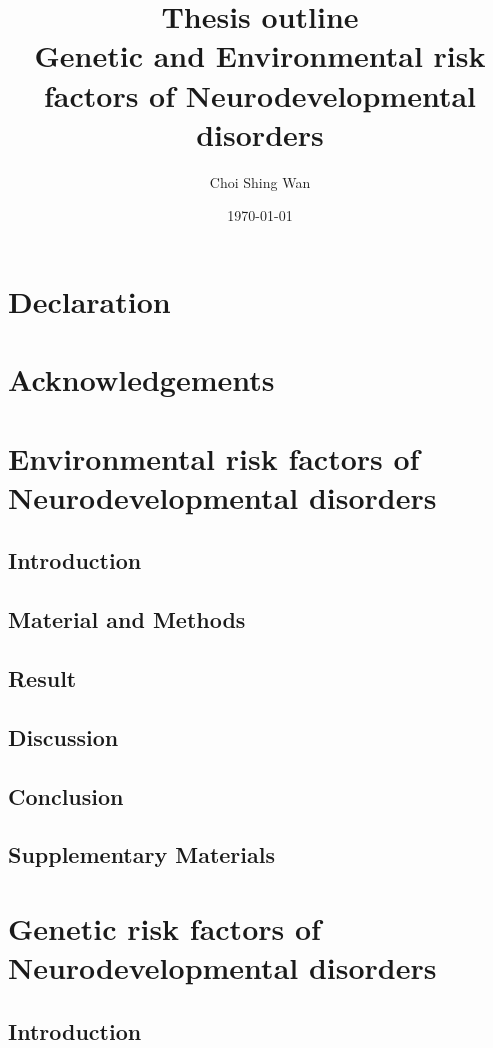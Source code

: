 \documentclass{report}
\title{Thesis outline \\
\large Genetic and Environmental risk factors of Neurodevelopmental disorders}
\date{\today}
\author{Choi Shing Wan}
\begin{document}
\maketitle
\chapter*{Declaration}
\chapter*{Acknowledgements}
\tableofcontents

 \onehalfspacing



\chapter{Environmental risk factors of Neurodevelopmental disorders}
\section{Introduction}

\section{Material and Methods}

\section{Result}

\section{Discussion}
\section{Conclusion}
\section{Supplementary Materials}


\chapter{Genetic risk factors of Neurodevelopmental disorders}
\section{Introduction}
\end{document}
